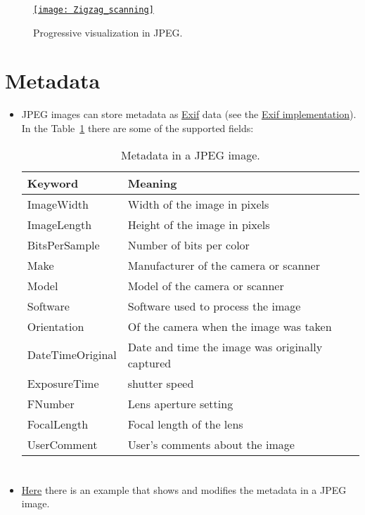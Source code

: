 \begin{figure}[H]
  \vspace{-2ex}
  \centering
  \href{https://es.m.wikipedia.org/wiki/Archivo:Zigzag_scanning.jpg}{\texttt{[image: Zigzag\_scanning]}}
  \caption{Progressive visualization in \gls{JPEG}.}
  \label{fig:JPEG_progressive}
\end{figure}

\section{Metadata}
\begin{itemize}
\item \gls{JPEG} images can store metadata as
  \href{https://en.wikipedia.org/wiki/Exif}{\gls{Exif}} data (see the
  \href{https://gitlab.com/TNThieding/exif/-/blob/master/docs/api_reference.rst?ref_type=heads}{Exif
    implementation}). In the Table~\ref{tab:JPEG_metadata} there are
  some of the supported fields:
  \begin{table}[!h]
    \vspace{2ex}
    \begin{center}
      \begin{tabular}{l|l}
        Keyword & Meaning\\
        \hline
        ImageWidth & Width of the image in pixels \\
        ImageLength & Height of the image in pixels \\
        BitsPerSample&  Number of bits per color \\
        Make & Manufacturer of the camera or scanner \\
        Model & Model of the camera or scanner \\
        Software & Software used to process the image \\
        Orientation & Of the camera when the image was taken \\
        DateTimeOriginal & Date and time the image was originally captured \\
        ExposureTime & shutter speed \\
        FNumber & Lens aperture setting \\
        FocalLength & Focal length of the lens \\
        UserComment & User's comments about the image
      \end{tabular}
    \end{center}
    \caption{Metadata in a JPEG image.}
    \label{tab:JPEG_metadata}
  \end{table}
\end{itemize}

\section*{}
\begin{itemize}
\item
  \href{https://github.com/vicente-gonzalez-ruiz/medical_imaging/blob/main/notebooks/JPEG_add_metadata.ipynb}{Here}
  there is an example that shows and modifies the metadata in a JPEG
  image.
\end{itemize}
